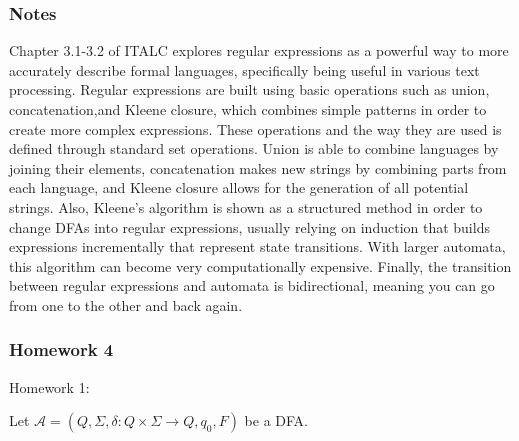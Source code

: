 \documentclass{article}
\theoremstyle{theorem}
\theoremstyle{definition}
\theoremstyle{remark}
\begin{document}
\subsubsection*{Notes}
Chapter 3.1-3.2 of ITALC explores regular expressions as a powerful way to more accurately describe formal languages, specifically being useful in various text processing. Regular expressions are built using basic operations such as union, concatenation,and Kleene closure, which combines simple patterns in order to create more complex expressions. These operations and the way they are used is defined through standard set operations. Union is able to combine languages by joining their elements, concatenation makes new strings by combining parts from each language, and Kleene closure allows for the generation of all potential strings. Also, Kleene's algorithm is shown as a structured method in order to change DFAs into regular expressions, usually relying on induction that builds expressions incrementally that represent state transitions. With larger automata, this algorithm can become very computationally expensive. Finally, the transition between regular expressions and automata is bidirectional, meaning you can go from one to the other and back again. 

\subsubsection*{Homework 4}

Homework 1:

Let $\mathcal{A} = (Q, \Sigma, \delta: Q \times \Sigma \to Q, q_0, F)$ be a DFA.
\end{document}
